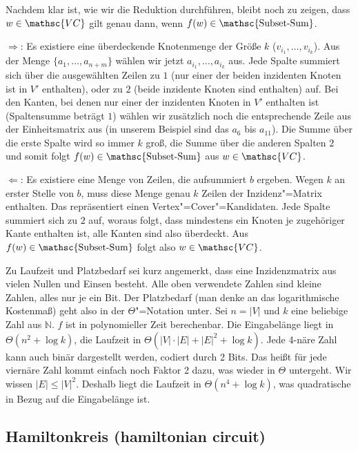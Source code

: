 Nachdem klar ist, wie wir die Reduktion durchführen, bleibt noch zu zeigen, dass $w \in \mathsc{VC}$ gilt genau dann, wenn $f(w) \in \operatorname{\mathsc{Subset-Sum}}$.

\glq$\Rightarrow$\grq: Es existiere eine überdeckende Knotenmenge der Größe $k$ ($v_{i_1}, \ldots, v_{i_k}$). Aus der Menge $\{a_1, \ldots, a_{n+m} \}$ wählen wir jetzt $a_{i_1}, \ldots , a_{i_k}$ aus. Jede Spalte summiert sich über die ausgewählten Zeilen zu $1$ (nur einer der beiden inzidenten Knoten ist in $V'$ enthalten), oder zu $2$ (beide inzidente Knoten sind enthalten) auf. Bei den Kanten, bei denen nur einer der inzidenten Knoten in $V'$ enthalten ist (Spaltensumme beträgt $1$) wählen wir zusätzlich noch die entsprechende Zeile aus der Einheitsmatrix aus (in unserem Beispiel sind das $a_6$ bis $a_{11}$). Die Summe über die erste Spalte wird so immer $k$ groß, die Summe über die anderen Spalten $2$ und somit folgt $f(w) \in \operatorname{\mathsc{Subset-Sum}}$ aus $w \in \mathsc{VC}$.

\glq$\Leftarrow$\grq: Es existiere eine Menge von Zeilen, die aufsummiert $b$ ergeben. Wegen $k$ an erster Stelle von $b$, muss diese Menge genau $k$ Zeilen der Inzidenz"=Matrix enthalten. Das repräsentiert einen Vertex"=Cover"=Kandidaten. Jede Spalte summiert sich zu $2$ auf, woraus folgt, dass mindestens ein Knoten je zugehöriger Kante enthalten ist, alle Kanten sind also überdeckt. Aus $f(w) \in \operatorname{\mathsc{Subset-Sum}}$ folgt also $w \in \mathsc{VC}$.

Zu Laufzeit und Platzbedarf sei kurz angemerkt, dass eine Inzidenzmatrix aus vielen Nullen und Einsen besteht. Alle oben verwendete Zahlen sind kleine Zahlen, alles nur je ein Bit. Der Platzbedarf (man denke an das logarithmische Kostenmaß) geht also in der $\Theta$"=Notation unter. Sei $n = |V|$ und $k$ eine beliebige Zahl aus $\mathbb{N}$. $f$ ist in polynomieller Zeit berechenbar. Die Eingabelänge liegt in $\Theta (n^2 + \log k)$, die Laufzeit in $\Theta (|V| \cdot |E| + |E|^2 + \log k)$. Jede 4-näre Zahl kann auch binär dargestellt werden, codiert durch 2 Bits. Das heißt für jede viernäre Zahl kommt einfach noch Faktor 2 dazu, was wieder in $\Theta$ untergeht. Wir wissen $|E| \le |V|^2$. Deshalb liegt die Laufzeit in $\Theta (n^4 + \log k)$, was quadratische in Bezug auf die Eingabelänge ist.

\subsection{Hamiltonkreis (hamiltonian circuit)}

